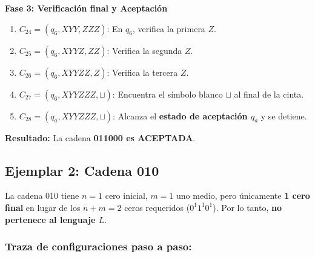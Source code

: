 \noindent\textbf{Fase 3: Verificación final y Aceptación}
\begin{enumerate}[label=\arabic*., start=24, leftmargin=*]
    \item $C_{24} = (q_6, XYY, ZZZ)$: En $q_6$, verifica la primera $Z$.
    \item $C_{25} = (q_6, XYYZ, ZZ)$: Verifica la segunda $Z$.
    \item $C_{26} = (q_6, XYYZZ, Z)$: Verifica la tercera $Z$.
    \item $C_{27} = (q_6, XYYZZZ, \sqcup)$: Encuentra el símbolo blanco $\sqcup$ al final de la cinta.
    \item $C_{28} = (q_a, XYYZZZ, \sqcup)$: Alcanza el \textbf{estado de aceptación $q_a$} y se detiene.
\end{enumerate}

\vspace{0.2cm}
\noindent\textbf{Resultado:} La cadena \textbf{011000 es ACEPTADA}.

\subsection*{Ejemplar 2: Cadena 010}

La cadena 010 tiene $n = 1$ cero inicial, $m = 1$ uno medio, pero únicamente \textbf{1 cero final} en lugar de los $n + m = 2$ ceros requeridos ($0^1 1^1 0^1$). Por lo tanto, \textbf{no pertenece al lenguaje $L$}.

\subsubsection*{Traza de configuraciones paso a paso:}

